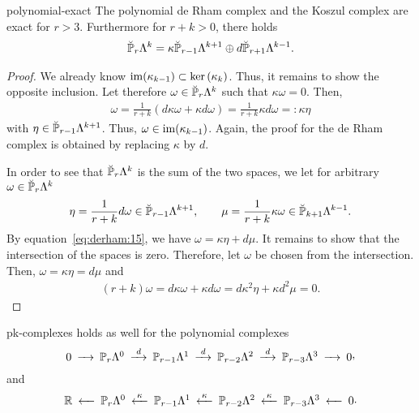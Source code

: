 \begin{Theorem}{polynomial-exact}
  The polynomial de Rham complex and the Koszul complex are exact for
  $r>3$. Furthermore for $r+k>0$, there holds
  \begin{gather}
    \label{eq:derham:17}
    \breve \P_r\Lambda^k = \kappa \breve\P_{r-1}\Lambda^{k+1}
    \oplus d\breve\P_{r+1}\Lambda^{k-1}.
  \end{gather}
\end{Theorem}

\begin{proof}
  We already know $\range{\kappa_{k-1}} \subset \ker{\kappa_k}$. Thus,
  it remains to show the opposite inclusion. Let therefore $\omega\in
  \breve \P_r\Lambda^k$ such that $\kappa\omega=0$. Then,
  \begin{gather*}
    \omega = \frac1{r+k} (d\kappa\omega+\kappa d\omega)
    = \frac1{r+k} \kappa d\omega =: \kappa\eta
  \end{gather*}
  with $\eta \in \breve\P_{r-1}\Lambda^{k+1}$. Thus,
  $\omega\in \range{\kappa_{k-1}}$. Again, the proof for the de Rham
  complex is obtained by replacing $\kappa$ by $d$.

  In order to see that $\breve \P_r\Lambda^k$ is the sum of the two
  spaces, we let for arbitrary $\omega\in \breve \P_r\Lambda^k$
  \begin{gather*}
    \eta = \frac1{r+k} d\omega \in \breve\P_{r-1}\Lambda^{k+1},
    \qquad
    \mu = \frac1{r+k} \kappa\omega \in \breve\P_{k+1}\Lambda^{k-1}.
  \end{gather*}
  By equation~\eqref{eq:derham:15}, we have
  $\omega = \kappa\eta + d\mu$. It remains to show that the
  intersection of the spaces is zero. Therefore, let $\omega$ be
  chosen from the intersection. Then, $\omega = \kappa\eta = d \mu$
  and
  \begin{gather*}
    (r+k)\omega = d\kappa \omega + \kappa d \omega
    = d \kappa^2 \eta + \kappa d^2 \mu = 0.
  \end{gather*}
\end{proof}

\begin{Corollary}{pk-complexes}
   holds as well for the
  polynomial complexes
  \begin{gather}\minCDarrowwidth15pt
    \begin{CD}
      0
      @>>> \P_r\Lambda^0
      @>{d}>> \P_{r-1}\Lambda^1
      @>{d}>> \P_{r-2}\Lambda^2
      @>{d}>> \P_{r-3}\Lambda^3
      @>>> 0
    \end{CD},
  \end{gather}
  and
  \begin{gather}\minCDarrowwidth15pt
    \begin{CD}
      \R
      @<<< \P_r\Lambda^0
      @<{\kappa}<< \P_{r-1}\Lambda^1
      @<{\kappa}<< \P_{r-2}\Lambda^2
      @<{\kappa}<< \P_{r-3}\Lambda^3
      @<<< 0
    \end{CD}.
  \end{gather}
\end{Corollary}

